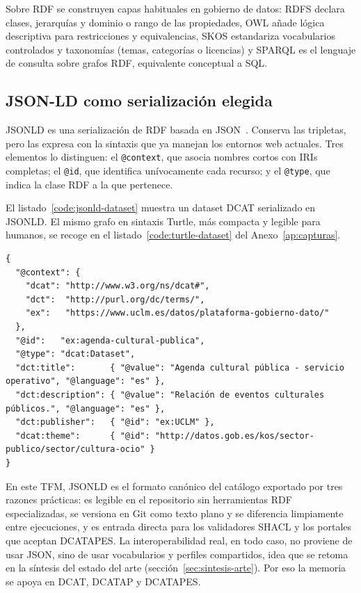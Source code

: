 Sobre \ac{RDF} se construyen capas habituales en gobierno de datos: \ac{RDFS} declara clases, jerarquías y dominio o rango de las propiedades, \ac{OWL} añade lógica descriptiva para restricciones y equivalencias, \ac{SKOS} estandariza vocabularios controlados y taxonomías (temas, categorías o licencias) y \ac{SPARQL} es el lenguaje de consulta sobre grafos \ac{RDF}, equivalente conceptual a \ac{SQL}.

\subsection{JSON-LD como serialización elegida}

\ac{JSONLD} es una serialización de \ac{RDF} basada en \ac{JSON}~\cite{w3cJsonLd}. Conserva las tripletas, pero las expresa con la sintaxis que ya manejan los entornos web actuales. Tres elementos lo distinguen: el \texttt{@context}, que asocia nombres cortos con \acp{IRI} completas; el \texttt{@id}, que identifica unívocamente cada recurso; y el \texttt{@type}, que indica la clase \ac{RDF} a la que pertenece.

El listado~\ref{code:jsonld-dataset} muestra un dataset \ac{DCAT} serializado en \ac{JSONLD}. El mismo grafo en sintaxis Turtle, más compacta y legible para humanos, se recoge en el listado~\ref{code:turtle-dataset} del Anexo~\ref{ap:capturas}.

\begin{lstlisting}[language=jsonld, caption={Dataset DCAT serializado en JSON-LD usando \texttt{@context} para acortar las IRIs.}, label=code:jsonld-dataset, captionpos=b]
{
  "@context": {
    "dcat": "http://www.w3.org/ns/dcat#",
    "dct":  "http://purl.org/dc/terms/",
    "ex":   "https://www.uclm.es/datos/plataforma-gobierno-dato/"
  },
  "@id":   "ex:agenda-cultural-publica",
  "@type": "dcat:Dataset",
  "dct:title":       { "@value": "Agenda cultural pública - servicio operativo", "@language": "es" },
  "dct:description": { "@value": "Relación de eventos culturales públicos.", "@language": "es" },
  "dct:publisher":   { "@id": "ex:UCLM" },
  "dcat:theme":      { "@id": "http://datos.gob.es/kos/sector-publico/sector/cultura-ocio" }
}
\end{lstlisting}

En este TFM, \ac{JSONLD} es el formato canónico del catálogo exportado por tres razones prácticas: es legible en el repositorio sin herramientas \ac{RDF} especializadas, se versiona en Git como texto plano y se diferencia limpiamente entre ejecuciones, y es entrada directa para los validadores \ac{SHACL} y los portales que aceptan \ac{DCATAPES}. La interoperabilidad real, en todo caso, no proviene de usar \ac{JSON}, sino de usar vocabularios y perfiles compartidos, idea que se retoma en la síntesis del estado del arte (sección~\ref{sec:sintesis-arte}). Por eso la memoria se apoya en \ac{DCAT}, \ac{DCATAP} y \ac{DCATAPES}.

